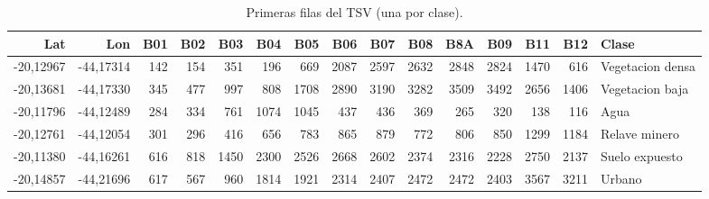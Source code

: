 \begin{table}[htbp]
 \centering
 \scriptsize
\setlength{\tabcolsep}{2.5pt}
 \caption{Primeras filas del TSV (una por clase).}
 \label{tab:muestra}
 \begin{tabular}{rrrrrrrrrrrrrrl}
  \toprule
  Lat & Lon & B01 & B02 & B03 & B04 & B05 & B06 & B07 & B08 & B8A & B09 & B11 & B12 & Clase \\
  \midrule
  -20{,}12967 & -44{,}17314 & 142 & 154 & 351 & 196 & 669 & 2087 & 2597 & 2632 & 2848 & 2824 & 1470 & 616 & Vegetacion densa \\
  -20{,}13681 & -44{,}17330 & 345 & 477 & 997 & 808 & 1708 & 2890 & 3190 & 3282 & 3509 & 3492 & 2656 & 1406 & Vegetacion baja \\
  -20{,}11796 & -44{,}12489 & 284 & 334 & 761 & 1074 & 1045 & 437 & 436 & 369 & 265 & 320 & 138 & 116 & Agua \\
  -20{,}12761 & -44{,}12054 & 301 & 296 & 416 & 656 & 783 & 865 & 879 & 772 & 806 & 850 & 1299 & 1184 & Relave minero \\
  -20{,}11380 & -44{,}16261 & 616 & 818 & 1450 & 2300 & 2526 & 2668 & 2602 & 2374 & 2316 & 2228 & 2750 & 2137 & Suelo expuesto \\
  -20{,}14857 & -44{,}21696 & 617 & 567 & 960 & 1814 & 1921 & 2314 & 2407 & 2472 & 2472 & 2403 & 3567 & 3211 & Urbano \\
  \bottomrule
 \end{tabular}
\end{table}
